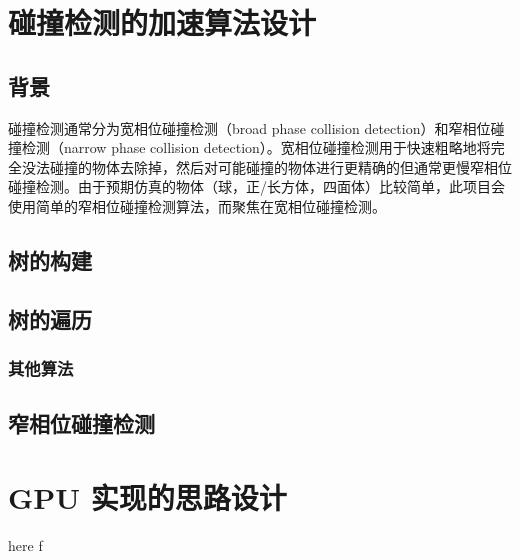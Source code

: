 \section{碰撞检测的加速算法设计}

\subsection{背景}

碰撞检测通常分为宽相位碰撞检测（broad phase collision detection）和窄相位碰撞检测（narrow phase collision detection）\cite{nvidiaCollisionDetection}。宽相位碰撞检测用于快速粗略地将完全没法碰撞的物体去除掉，然后对可能碰撞的物体进行更精确的但通常更慢窄相位碰撞检测。由于预期仿真的物体（球，正/长方体，四面体）比较简单，此项目会使用简单的窄相位碰撞检测算法，而聚焦在宽相位碰撞检测。

\subsection{树的构建}



\subsection{树的遍历}

\subsubsection{其他算法}

\subsub

\subsection{窄相位碰撞检测}

\section{GPU 实现的思路设计}

here \cite{nvidiaTreeTraversal} f \cite{nvidiaTreeConstruction}


